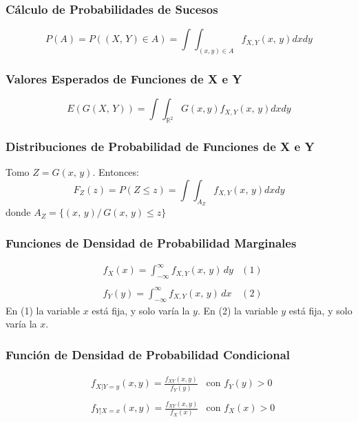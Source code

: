 \documentclass{article}
\newcommand{\comma}{,\,}                                %
\newcommand{\tq}{/\,}                                   %
\newcommand{\reales}{\mathbb{R}}                        %
\begin{document}
\subsubsection{Cálculo de Probabilidades de Sucesos}
\begin{equation*}
    P(A) = P((X\comma Y) \in A) = \int \int_{(x,y) \in A}f_{X,Y}(x \comma y) dxdy
\end{equation*}

\subsubsection{Valores Esperados de Funciones de X e Y}
\begin{equation*}
    E(G(X \comma Y)) = \int \int_{\reales^2} G(x,y) f_{X,Y}(x \comma y) dxdy
\end{equation*}

\subsubsection{Distribuciones de Probabilidad de Funciones de X e Y}
Tomo $Z = G(x \comma y)$. Entonces:
\begin{equation*}
    F_Z(z) = P(Z \leq z) = \int \int_{A_Z}f_{X,Y}(x \comma y) dxdy
\end{equation*}
donde $A_Z = \{(x \comma y) \tq G(x \comma y) \leq z\}$

\subsubsection{Funciones de Densidad de Probabilidad Marginales}
\begin{equation*}
    \begin{array}{lcc}
     & f_X(x) = \int_{- \infty}^\infty f_{X , Y} (x \comma y) \, dy  &(1)\\
     \\
     &  f_Y(y) =\int_{- \infty}^\infty f_{X , Y} (x \comma y) \, dx  &(2)
\end{array}
\end{equation*}
En (1) la variable $x$ está fija, y solo varía la $y$. En (2) la variable $y$ está fija, y solo varía la $x$.

\subsubsection{Función de Densidad de Probabilidad Condicional}
\begin{equation*}
    \begin{array}{lcc}
     & f_{X|Y=y}(x,y) = \frac{f_{XY}(x,y)}{f_Y(y)}  &\text{con } f_Y(y) > 0\\
     \\
     & f_{Y|X=x}(x,y) = \frac{f_{XY}(x,y)}{f_X(x)} &\text{con } f_X(x) > 0
\end{array}
\end{equation*}
\end{document}

